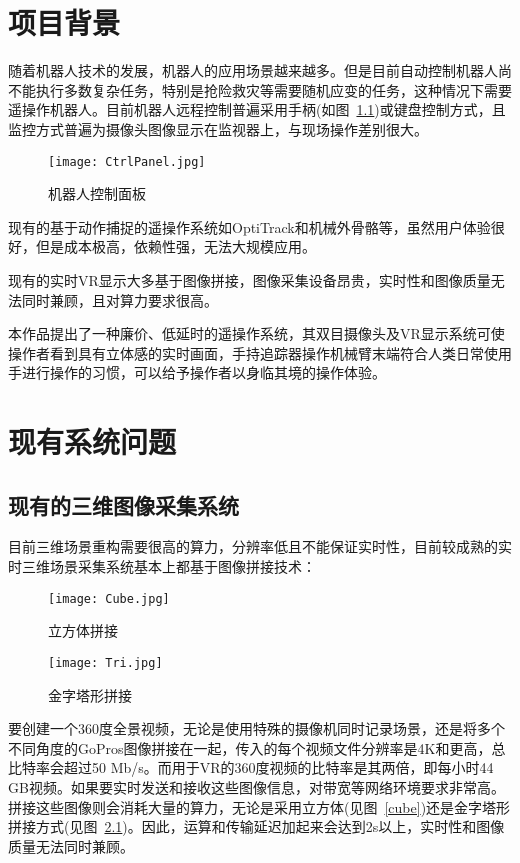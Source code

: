 \chapter{项目背景}

随着机器人技术的发展，机器人的应用场景越来越多。但是目前自动控制机器人尚不能执行多数复杂任务，特别是抢险救灾等需要随机应变的任务，这种情况下需要遥操作机器人。目前机器人远程控制普遍采用手柄(如图~\ref{panal})或键盘控制方式，且监控方式普遍为摄像头图像显示在监视器上，与现场操作差别很大。


\begin{figure}[htbp]
\centering
\texttt{[image: CtrlPanel.jpg]}
\caption{机器人控制面板} 
\label{panal}
\end{figure}

现有的基于动作捕捉的遥操作系统如OptiTrack和机械外骨骼等，虽然用户体验很好，但是成本极高，依赖性强，无法大规模应用。

现有的实时VR显示大多基于图像拼接，图像采集设备昂贵，实时性和图像质量无法同时兼顾，且对算力要求很高。

本作品提出了一种廉价、低延时的遥操作系统，其双目摄像头及VR显示系统可使操作者看到具有立体感的实时画面，手持追踪器操作机械臂末端符合人类日常使用手进行操作的习惯，可以给予操作者以身临其境的操作体验。


\chapter{现有系统问题}

\section{现有的三维图像采集系统}

目前三维场景重构需要很高的算力，分辨率低且不能保证实时性，目前较成熟的实时三维场景采集系统基本上都基于图像拼接技术：

\begin{figure}
\begin{minipage}{0.48\textwidth}
  \centering
  \texttt{[image: Cube.jpg]}
  \caption{立方体拼接}
  \label{cube}
\end{minipage}\hfill
\begin{minipage}{0.48\textwidth}
  \centering
  \texttt{[image: Tri.jpg]}
  \caption{金字塔形拼接}
  \label{tri}
\end{minipage}
\end{figure}

要创建一个360度全景视频，无论是使用特殊的摄像机同时记录场景，还是将多个不同角度的GoPros图像拼接在一起，传入的每个视频文件分辨率是4K和更高，总比特率会超过50 Mb/s。而用于VR的360度视频的比特率是其两倍，即每小时44 GB视频。如果要实时发送和接收这些图像信息，对带宽等网络环境要求非常高。拼接这些图像则会消耗大量的算力，无论是采用立方体(见图~\ref{cube})还是金字塔形拼接方式(见图~\ref{tri})。因此，运算和传输延迟加起来会达到2s以上，实时性和图像质量无法同时兼顾。

